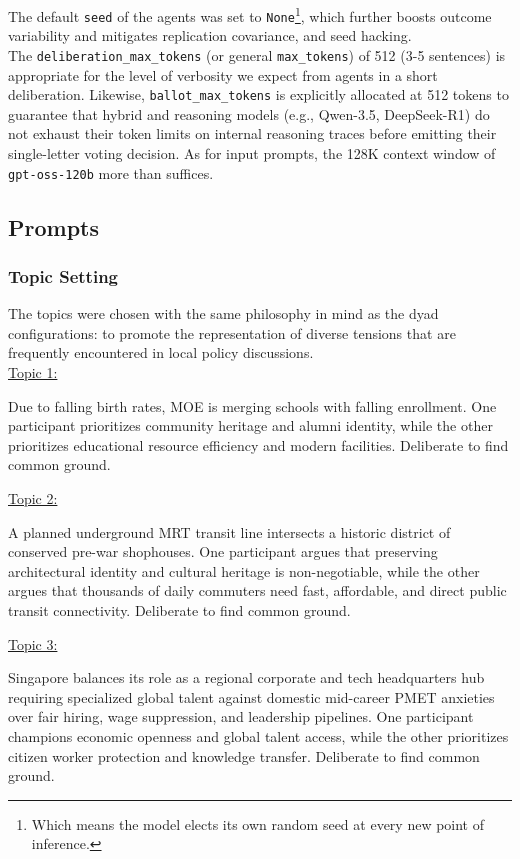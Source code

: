 \documentclass[titlepage]{article}
\begin{document}
The default \texttt{seed} of the agents was set to \texttt{None}\footnote{Which means the model elects its own random seed at every new point of inference.}, which further boosts outcome variability and mitigates replication covariance, and seed hacking.\\

The \texttt{deliberation\_max\_tokens} (or general \texttt{max\_tokens}) of 512 (3-5 sentences) is appropriate for the level of verbosity we expect from agents in a short deliberation. Likewise, \texttt{ballot\_max\_tokens} is explicitly allocated at 512 tokens to guarantee that hybrid and reasoning models (e.g., Qwen-3.5, DeepSeek-R1) do not exhaust their token limits on internal reasoning traces before emitting their single-letter voting decision. As for input prompts, the 128K context window of \texttt{gpt-oss-120b} more than suffices.

\subsection{Prompts}
\subsubsection{Topic Setting}
The topics were chosen with the same philosophy in mind as the dyad configurations: to promote the representation of diverse tensions that are frequently encountered in local policy discussions.\\

\underline{Topic 1:}
\begin{sidequote}
    Due to falling birth rates, MOE is merging schools with falling enrollment. One participant prioritizes community heritage and alumni identity, while the other prioritizes educational resource efficiency and modern facilities. Deliberate to find common ground.
\end{sidequote}

\underline{Topic 2:}
\begin{sidequote}
    A planned underground MRT transit line intersects a historic district of conserved pre-war shophouses. One participant argues that preserving architectural identity and cultural heritage is non-negotiable, while the other argues that thousands of daily commuters need fast, affordable, and direct public transit connectivity. Deliberate to find common ground.
\end{sidequote}

\underline{Topic 3:}
\begin{sidequote}
    Singapore balances its role as a regional corporate and tech headquarters hub requiring specialized global talent against domestic mid-career PMET anxieties over fair hiring, wage suppression, and leadership pipelines. One participant champions economic openness and global talent access, while the other prioritizes citizen worker protection and knowledge transfer. Deliberate to find common ground.
\end{sidequote}
\end{document}
